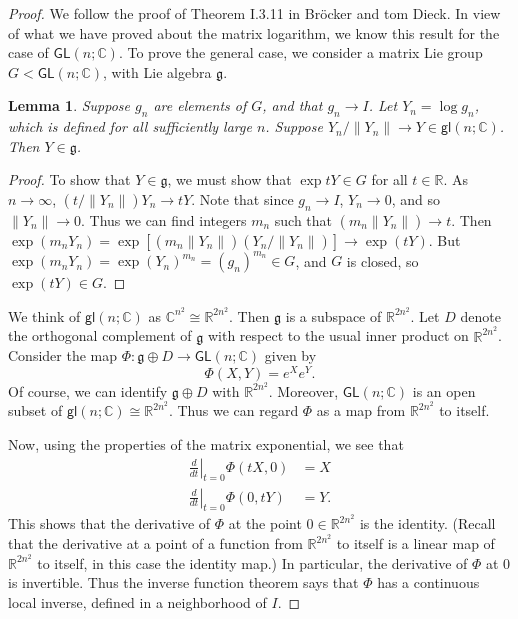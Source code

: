 \documentclass[12pt]{amsbook}
\let \frak = \mathfrak
\theoremstyle{plain}
\newtheorem{lemma}[theorem]{Lemma}
\numberwithin{equation}{chapter}
\numberwithin{theorem}{chapter}
\begin{document}
\begin{proof}
We follow the proof of Theorem I.3.11 in Br\"{o}cker and tom Dieck. In view of
what we have proved about the matrix logarithm, we know this result for the
case of $\mathsf{GL}(n;\mathbb{C})$. To prove the general case, we consider a
matrix Lie group $G<\mathsf{GL}(n;\mathbb{C})$, with Lie algebra $\frak{g}$.

\begin{lemma}
Suppose $g_{n}$ are elements of $G$, and that $g_{n}\rightarrow I$. Let
$Y_{n}=\log g_{n}$, which is defined for all sufficiently large $n$. Suppose
$Y_{n}/\left\|  Y_{n}\right\|  \rightarrow Y\in\mathsf{gl}\left(
n;\mathbb{C}\right)  $. Then $Y\in\frak{g}$.
\end{lemma}

\begin{proof}
To show that $Y\in\frak{g}$, we must show that $\exp tY\in G$ for all
$t\in\mathbb{R}$. As $n\rightarrow\infty$, $\left(  t/\left\|  Y_{n}\right\|
\right)  Y_{n}\rightarrow tY$. Note that since $g_{n}\rightarrow I$,
$Y_{n}\rightarrow0$, and so $\left\|  Y_{n}\right\|  \rightarrow0$. Thus we
can find integers $m_{n}$ such that $\left(  m_{n}\left\|  Y_{n}\right\|
\right)  \rightarrow t$. Then $\exp\left(  m_{n}Y_{n}\right)  =\exp\left[
\left(  m_{n}\left\|  Y_{n}\right\|  \right)  \left(  Y_{n}/\left\|
Y_{n}\right\|  \right)  \right]  \rightarrow\exp\left(  tY\right)  $. But
$\exp\left(  m_{n}Y_{n}\right)  =\exp\left(  Y_{n}\right)  ^{m_{n}}=\left(
g_{n}\right)  ^{m_{n}}\in G$, and $G$ is closed, so $\exp\left(  tY\right)
\in G$.
\end{proof}

We think of $\mathsf{gl}\left(  n;\mathbb{C}\right)  $ as $\mathbb{C}^{n^{2}%
}\cong\mathbb{R}^{2n^{2}}$. Then $\frak{g}$ is a subspace of $\mathbb{R}%
^{2n^{2}}$. Let $D$ denote the orthogonal complement of $\frak{g}$ with
respect to the usual inner product on $\mathbb{R}^{2n^{2}}$. Consider the map
$\Phi:\frak{g}\oplus D\rightarrow\mathsf{GL}(n;\mathbb{C})$ given by
\[
\Phi\left(  X,Y\right)  =e^{X}e^{Y}\text{.}%
\]
Of course, we can identify $\frak{g}\oplus D$ with $\mathbb{R}^{2n^{2}}$.
Moreover, $\mathsf{GL}(n;\mathbb{C})$ is an open subset of $\mathsf{gl}\left(
n;\mathbb{C}\right)  \cong\mathbb{R}^{2n^{2}}$. Thus we can regard $\Phi$ as a
map from $\mathbb{R}^{2n^{2}}$ to itself.

Now, using the properties of the matrix exponential, we see that
\begin{align*}
\left.  \frac{d}{dt}\right|  _{t=0}\Phi\left(  tX,0\right)    & =X\\
\left.  \frac{d}{dt}\right|  _{t=0}\Phi\left(  0,tY\right)    & =Y\text{.}%
\end{align*}
This shows that the derivative of $\Phi$ at the point $0\in\mathbb{R}^{2n^{2}%
}$ is the identity. (Recall that the derivative at a point of a function from
$\mathbb{R}^{2n^{2}}$ to itself is a linear map of $\mathbb{R}^{2n^{2}}$ to
itself, in this case the identity map.) In particular, the derivative of
$\Phi$ at 0 is invertible. Thus the inverse function theorem says that $\Phi$
has a continuous local inverse, defined in a neighborhood of $I$.


\end{proof}
\end{document}
